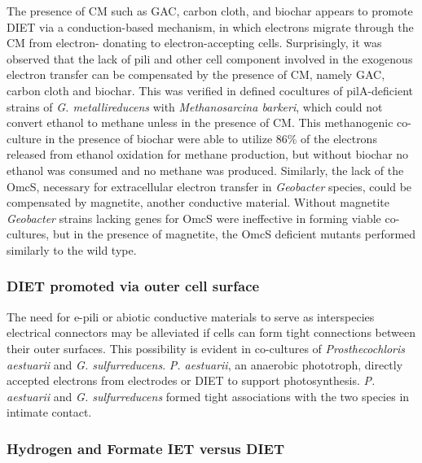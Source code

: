 \documentclass[fontsize=12pt,headsepline=true, bibliography=totocnumbered, twoside]{scrbook} %
\begin{document}
The presence of \ac{CM} such as \ac{GAC}, carbon cloth, and biochar appears to promote \ac{DIET}  via a conduction-based mechanism, 
in which electrons migrate through the \ac{CM} from electron- donating to electron-accepting cells.\citep{martins2018methane} Surprisingly,
 it was observed that the lack of pili and other cell component involved in the exogenous electron transfer can be 
 compensated by the presence of \ac{CM}, namely \ac{GAC}, carbon cloth and biochar.\citep{lovley2017syntrophy} This was verified in defined cocultures 
 of pilA-deficient strains of \textit{G. metallireducens} with \textit{Methanosarcina barkeri}, which could not convert ethanol to methane
  unless in the presence of \ac{CM}. This methanogenic co-culture in the presence of biochar were able to utilize 86\% 
  of the electrons released from ethanol oxidation for methane production, but without biochar no ethanol was 
  consumed and no methane was produced.\citep{chen2014promoting} Similarly, the lack of the \ac{OmcS},
   necessary for extracellular electron transfer in \textit{Geobacter} species, could be compensated by magnetite, 
   another conductive material. Without magnetite \textit{Geobacter} strains lacking genes for \ac{OmcS} were ineffective
    in forming viable co-cultures, but in the presence of magnetite, the \ac{OmcS} deficient mutants
     performed similarly to the wild type\citep{lovley2017syntrophy, martins2018methane}.
     
     
\subsubsection{\ac{DIET} promoted via outer cell surface}


The need for \acf{e-pili} or abiotic conductive materials to serve as interspecies electrical connectors may be alleviated if cells can form tight connections between their outer surfaces. This possibility is evident in co-cultures of \textit{Prosthecochloris aestuarii} and \textit{G. sulfurreducens}. \textit{P. aestuarii}, an anaerobic phototroph, directly accepted electrons from electrodes or \ac{DIET} to support photosynthesis. \textit{P. aestuarii} and \textit{G. sulfurreducens} formed tight associations with the two species in intimate contact\citep{lovley2017syntrophy}.


\subsubsection{Hydrogen and Formate \ac{IET} versus \ac{DIET}}
\end{document}
